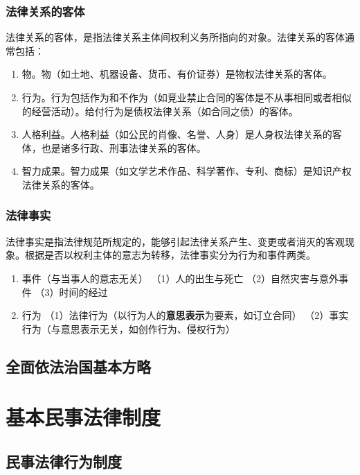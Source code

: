 \documentclass[UTF8,12pt]{ctexart}
\numberwithin{equation}{section} %
\numberwithin{figure}{section}
\numberwithin{table}{section}
\begin{document}
	\subsubsection{法律关系的客体}
	法律关系的客体，是指法律关系主体间权利义务所指向的对象。法律关系的客体通常包括：
	\begin{enumerate}
		\item 物。物（如土地、机器设备、货币、有价证券）是物权法律关系的客体。
		
		\item 行为。行为包括作为和不作为（如竞业禁止合同的客体是不从事相同或者相似的经营活动）。给付行为是债权法律关系（如合同之债）的客体。
		
		\item 人格利益。人格利益（如公民的肖像、名誉、人身）是人身权法律关系的客体，也是诸多行政、刑事法律关系的客体。
		
		\item 智力成果。智力成果（如文学艺术作品、科学著作、专利、商标）是知识产权法律关系的客体。
	\end{enumerate}
	
	
	\subsubsection{法律事实}
	法律事实是指法律规范所规定的，能够引起法律关系产生、变更或者消灭的客观现象。根据是否以权利主体的意志为转移，法律事实分为行为和事件两类。
	\begin{enumerate}
		\item 事件（与当事人的意志无关）
		（1）人的出生与死亡
		（2）自然灾害与意外事件
		（3）时间的经过
		
		\item 行为
		（1）法律行为（以行为人的\textbf{意思表示}为要素，如订立合同）
		（2）事实行为（与意思表示无关，如创作行为、侵权行为）
	\end{enumerate}
	
	
	
	\subsection{全面依法治国基本方略}
	
	\newpage
	
	\section{基本民事法律制度}
	
	\subsection{民事法律行为制度}
\end{document}
